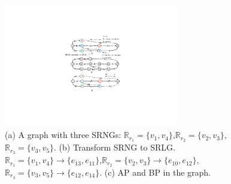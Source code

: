 \begin{figure}[tp]
  \centering
  \includegraphics[width=3.0in]{franz/SRNG}
  \caption{(a) A graph with three SRNGs: $\mathbb{R}_{r_1}=\{v_1,v_4\}$,$\mathbb{R}_{r_2}=\{v_2,v_3\}$,$\mathbb{R}_{r_3}=\{v_3,v_5\}$. (b) Transform SRNG to SRLG. $\mathbb{R}_{r_1}=\{v_1,v_4\}\rightarrow \{e_{13},e_{11}\}$,$\mathbb{R}_{r_2}=\{v_2,v_3\}\rightarrow \{e_{10},e_{12}\}$,$\mathbb{R}_{r_3}=\{v_3,v_5\}\rightarrow \{e_{12},e_{14}\}$. (c) AP and BP in the graph.}\label{fig:SRNG}
  \label{fig:SRNG}
\end{figure}



